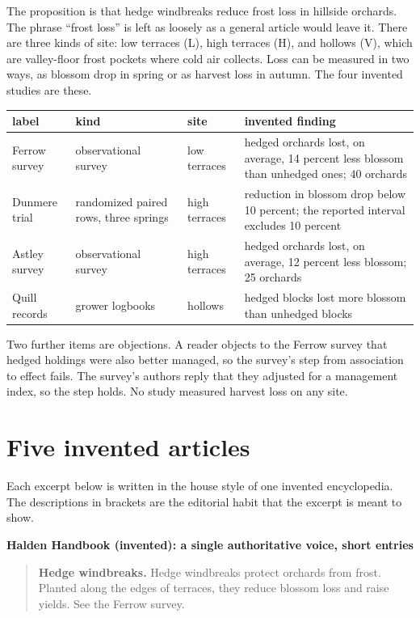 \documentclass[11pt]{article}
\newenvironment{excerpt}[1]
  {\par\smallskip\noindent\textbf{#1}\par\begin{quote}\small}
  {\end{quote}}
\begin{document}
The proposition is that hedge windbreaks reduce frost loss in hillside orchards. The phrase ``frost loss'' is left as loosely as a general article would leave it. There are three kinds of site: low terraces (L), high terraces (H), and hollows (V), which are valley-floor frost pockets where cold air collects. Loss can be measured in two ways, as blossom drop in spring or as harvest loss in autumn. The four invented studies are these.

\begin{center}
\small
\begin{tabularx}{\textwidth}{@{}l l l X@{}}
\toprule
label & kind & site & invented finding\\
\midrule
Ferrow survey & observational survey & low terraces & hedged orchards lost, on average, 14 percent less blossom than unhedged ones; 40 orchards\\
Dunmere trial & randomized paired rows, three springs & high terraces & reduction in blossom drop below 10 percent; the reported interval excludes 10 percent\\
Astley survey & observational survey & high terraces & hedged orchards lost, on average, 12 percent less blossom; 25 orchards\\
Quill records & grower logbooks & hollows & hedged blocks lost more blossom than unhedged blocks\\
\bottomrule
\end{tabularx}
\end{center}

Two further items are objections. A reader objects to the Ferrow survey that hedged holdings were also better managed, so the survey's step from association to effect fails. The survey's authors reply that they adjusted for a management index, so the step holds. No study measured harvest loss on any site.

\section{Five invented articles}\label{sec:articles}

Each excerpt below is written in the house style of one invented encyclopedia. The descriptions in brackets are the editorial habit that the excerpt is meant to show.

\begin{excerpt}{Halden Handbook (invented): a single authoritative voice, short entries}
\textbf{Hedge windbreaks.} Hedge windbreaks protect orchards from frost. Planted along the edges of terraces, they reduce blossom loss and raise yields. See the Ferrow survey.
\end{excerpt}
\end{document}
